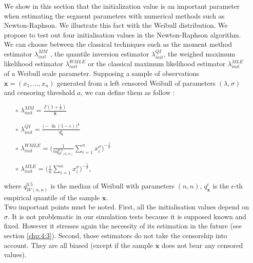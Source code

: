 \begin{appendices}
We show in this section that the initialization value is an important parameter when estimating the segment parameters with numerical methods such as Newton-Raphson. We illustrate this fact with the Weibull distribution.
We propose to test out four initialisation values in the Newton-Raphson algorithm. We can choose between the classical techniques such as the moment method estimator $\lambda_{init}^{MM}$ \cite{Johnson1994}, the quantile inversion estimator $\lambda_{init}^{QI}$, the weighed maximum likelihood estimator $\lambda_{init}^{WMLE}$ \cite{sadani2019new} or the classical maximum likelihood estimator $\lambda_{init}^{MLE}$ of a Weibull scale parameter. Supposing a sample of observations $\bm x = (x_1,...,x_n)$ generated from a left censored Weibull of parameters $(\lambda,\sigma)$ and censoring threshold $a$, we can define them as follow : 
    \begin{itemize}
        \item[$\circ$] $\lambda_{init}^{MM} =\frac{\Gamma(1+\frac{1}{\sigma})}{\bar{\bm x}}$ 
        \item[$\circ$] $\lambda_{init}^{QI} = \frac{\bigg(-\ln(1-\epsilon)\bigg)^{\frac{1}{\sigma}}}{q_{\bm x}^\epsilon}$
        \item[$\circ$] $\lambda_{init}^{WMLE} = \bigg(\frac{1}{nq^{0.5}_{\mathcal{W}(n,n)}}\sum_{i = 1}^nx_i^\sigma \bigg)^{-\frac{1}{\sigma}}$
        \item[$\circ$] $\lambda_{init}^{MLE} = \bigg(\frac{1}{n}\sum_{i = 1}^nx_i^\sigma \bigg)^{-\frac{1}{\sigma}}$, 
    \end{itemize}
    where $q^{0.5}_{\mathcal{W}(n,n)}$ is the median of Weibull with parameters $(n,n)$, $q_{\bm x}^\epsilon$ is the $\epsilon$-th empirical quantile of the sample $\bm x$. \\
     Two important points must be noted. First, all the initialisation values depend on $\sigma$. It is not problematic in our simulation tests because it is supposed known and fixed. However it stresses again the necessity of its estimation in the future (see section \ref{chp:4:3}). Second, those estimators do not take the censorship into account. They are all biased (except if the sample $\bm x$ does not bear any censored values). \\

\end{appendices}
